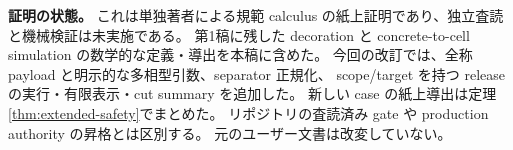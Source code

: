 \documentclass[11pt,a4paper]{article}
\begin{document}
\textbf{証明の状態。}
これは単独著者による規範 calculus の紙上証明であり、独立査読と機械検証は未実施である。
第1稿に残した decoration と concrete-to-cell simulation の数学的な定義・導出を本稿に含めた。
今回の改訂では、全称 payload と明示的な多相型引数、separator 正規化、
scope/target を持つ release の実行・有限表示・cut summary を追加した。
新しい case の紙上導出は定理\ref{thm:extended-safety}でまとめた。
リポジトリの査読済み gate や production authority の昇格とは区別する。
元のユーザー文書は改変していない。
\end{document}
